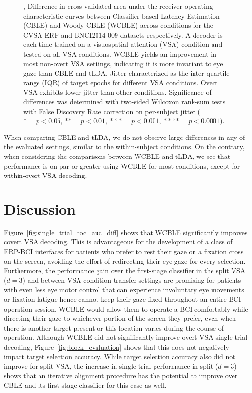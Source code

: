 \begin{figure}
  \caption[Cross-condition classifier performance and estimated jitter.]{
		,
    Difference in cross-validated area under the receiver
		operating characteristic curves between Classifier-based Latency Estimation
    (CBLE) and Woody CBLE (WCBLE) across conditions for the CVSA-ERP and
    BNCI2014-009 datasets respectively.
    A decoder is each	time trained on a visuospatial attention (VSA) condition
    and tested on all VSA conditions.
    WCBLE yields an improvement in most
		non-overt VSA settings, indicating it is more invariant to eye gaze than
    CBLE and tLDA.
		 Jitter characterized as the inter-quartile range (IQR)
		of target epochs for different VSA conditions. Overt VSA exhibits lower
    jitter than other conditions.
    Significance of differences
    was determined with two-sided Wilcoxon rank-sum tests with False Discovery
    Rate correction on per-subject jitter ($*= p<0.05$, $**=p<0.01$,
    $***=p<0.001$, $****=p<0.0001$).
	}
\end{figure}
When comparing CBLE and tLDA, we do not observe large differences in any of the
evaluated settings, similar to the within-subject conditions.
On the contrary, when considering the comparisons between WCBLE and tLDA, we
see that performance is on par or greater using WCBLE for most conditions,
except for within-overt VSA decoding.

\section{Discussion}

Figure~\ref{fig:single_trial_roc_auc_diff} shows that WCBLE significantly improves
covert VSA decoding.
This is advantageous for the development of a class of ERP-BCI interfaces for
patients who prefer to rest their gaze on a fixation cross on the screen,
avoiding the effort of redirecting their eye gaze for every selection.
Furthermore, the performance gain over the first-stage classifier in the split
VSA ($d=3$) and between-VSA condition transfer settings are promising for
patients with even less eye motor control that can experience involuntary eye
movements or fixation fatigue hence cannot keep their gaze fixed throughout an
entire BCI operation session.
WCBLE would allow them to operate a BCI comfortably while directing
their gaze to whichever portion of the screen they prefer, even when there is
another target present or this location varies during the
course of operation.
Although WCBLE did not significantly improve overt VSA single-trial decoding,
Figure~\ref{fig:block_evaluation} shows that this does not negatively impact target
selection accuracy.
While target selection accuracy also did not improve for split VSA, the
increase in single-trial performance in split ($d=3$) shows that an iterative
alignment procedure has the potential to improve over CBLE and its first-stage
classifier for this case as well.


